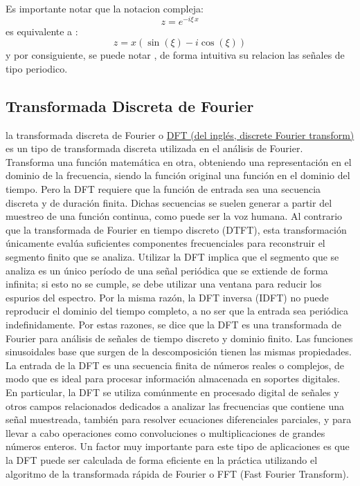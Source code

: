 \documentclass[a4paper]{article}
\begin{document}
Es importante notar que la notacion compleja:
$$z = e^{{-i\xi \,x}} $$
es equivalente a :
$$z = x(\sin({\xi}) - i\cos({\xi}))$$
y por consiguiente, se puede notar , de forma intuitiva su relacion las se\~nales de tipo periodico.

\subsection{Transformada Discreta de Fourier}

la transformada discreta de Fourier o \href{https://es.wikipedia.org/wiki/Transformada_de_Fourier_discreta}{DFT (del inglés, discrete Fourier transform)} es un tipo de transformada discreta utilizada en el análisis de Fourier. Transforma una función matemática en otra, obteniendo una representación en el dominio de la frecuencia, siendo la función original una función en el dominio del tiempo. Pero la DFT requiere que la función de entrada sea una secuencia discreta y de duración finita. Dichas secuencias se suelen generar a partir del muestreo de una función continua, como puede ser la voz humana. Al contrario que la transformada de Fourier en tiempo discreto (DTFT), esta transformación únicamente evalúa suficientes componentes frecuenciales para reconstruir el segmento finito que se analiza. Utilizar la DFT implica que el segmento que se analiza es un único período de una señal periódica que se extiende de forma infinita; si esto no se cumple, se debe utilizar una ventana para reducir los espurios del espectro. Por la misma razón, la DFT inversa (IDFT) no puede reproducir el dominio del tiempo completo, a no ser que la entrada sea periódica indefinidamente. Por estas razones, se dice que la DFT es una transformada de Fourier para análisis de señales de tiempo discreto y dominio finito. Las funciones sinusoidales base que surgen de la descomposición tienen las mismas propiedades.
\\
La entrada de la DFT es una secuencia finita de números reales o complejos, de modo que es ideal para procesar información almacenada en soportes digitales. En particular, la DFT se utiliza comúnmente en procesado digital de señales y otros campos relacionados dedicados a analizar las frecuencias que contiene una señal muestreada, también para resolver ecuaciones diferenciales parciales, y para llevar a cabo operaciones como convoluciones o multiplicaciones de grandes números enteros. Un factor muy importante para este tipo de aplicaciones es que la DFT puede ser calculada de forma eficiente en la práctica utilizando el algoritmo de la transformada rápida de Fourier o FFT (Fast Fourier Transform).
\end{document}

